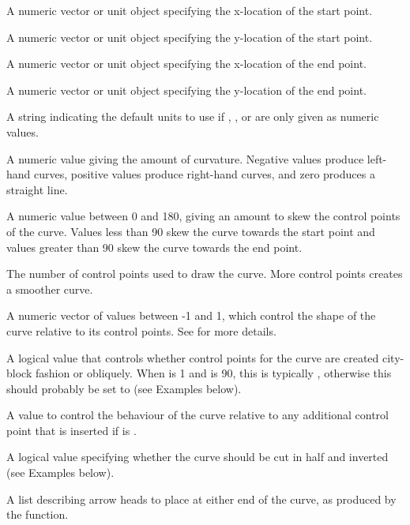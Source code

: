 \begin{Arguments}
\begin{ldescription}
\item[\code{x1}] A numeric vector or unit object specifying the x-location of
the start point.
\item[\code{y1}] A numeric vector or unit object specifying the y-location of
the start point.
\item[\code{x2}] A numeric vector or unit object specifying the x-location of
the end point.
\item[\code{y2}] A numeric vector or unit object specifying the y-location of
the end point.
\item[\code{default.units}] A string indicating the default units to use
if , ,  or 
are only given as numeric values.
\item[\code{curvature}] A numeric value giving the amount of curvature.
Negative values produce left-hand curves, positive values
produce right-hand curves, and zero produces a straight line.
\item[\code{angle}] A numeric value between 0 and 180,
giving an amount to skew the control
points of the curve.  Values less than 90 skew the curve towards
the start point and values greater than 90 skew the curve
towards the end point.
\item[\code{ncp}] The number of control points used to draw the curve.
More control points creates a smoother curve.
\item[\code{shape}] A numeric vector of values between -1 and 1, which
control the shape of the curve relative to its control points.
See  for more details.
\item[\code{square}] A logical value that controls whether control
points for the curve are created city-block fashion or
obliquely.  When  is 1 and  is 90,
this is typically , otherwise this should probably
be set to  (see Examples below).
\item[\code{squareShape}] A  value to control the behaviour
of the curve relative to any additional control point that
is inserted if  is .
\item[\code{inflect}] A logical value specifying whether the curve
should be cut in half and inverted (see Examples below).
\item[\code{arrow}] A list describing arrow heads to place at either end
of the curve, as produced by the  function.

\end{ldescription}
\end{Arguments}
